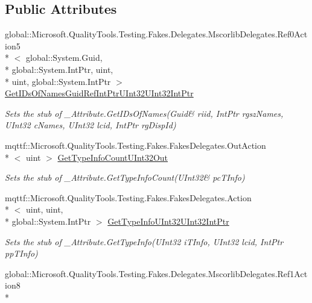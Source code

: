 \subsection*{Public Attributes}
\begin{DoxyCompactItemize}
\item 
global\-::\-Microsoft.\-Quality\-Tools.\-Testing.\-Fakes.\-Delegates.\-Mscorlib\-Delegates.\-Ref0\-Action5\\*
$<$ global\-::\-System.\-Guid, \\*
global\-::\-System.\-Int\-Ptr, uint, \\*
uint, global\-::\-System.\-Int\-Ptr $>$ \hyperlink{class_system_1_1_runtime_1_1_interop_services_1_1_fakes_1_1_stub___attribute_ac09dcb88e3cef99bbc25b5793b2cf921}{Get\-I\-Ds\-Of\-Names\-Guid\-Ref\-Int\-Ptr\-U\-Int32\-U\-Int32\-Int\-Ptr}
\begin{DoxyCompactList}\small\item\em Sets the stub of \-\_\-\-Attribute.\-Get\-I\-Ds\-Of\-Names(Guid\& riid, Int\-Ptr rgsz\-Names, U\-Int32 c\-Names, U\-Int32 lcid, Int\-Ptr rg\-Disp\-Id)\end{DoxyCompactList}\item 
mqttf\-::\-Microsoft.\-Quality\-Tools.\-Testing.\-Fakes.\-Fakes\-Delegates.\-Out\-Action\\*
$<$ uint $>$ \hyperlink{class_system_1_1_runtime_1_1_interop_services_1_1_fakes_1_1_stub___attribute_a89ae0abf374e44257d2ba7c2fb028fab}{Get\-Type\-Info\-Count\-U\-Int32\-Out}
\begin{DoxyCompactList}\small\item\em Sets the stub of \-\_\-\-Attribute.\-Get\-Type\-Info\-Count(U\-Int32\& pc\-T\-Info)\end{DoxyCompactList}\item 
mqttf\-::\-Microsoft.\-Quality\-Tools.\-Testing.\-Fakes.\-Fakes\-Delegates.\-Action\\*
$<$ uint, uint, \\*
global\-::\-System.\-Int\-Ptr $>$ \hyperlink{class_system_1_1_runtime_1_1_interop_services_1_1_fakes_1_1_stub___attribute_a9c5bca549aafbb4d72a12629efad0c88}{Get\-Type\-Info\-U\-Int32\-U\-Int32\-Int\-Ptr}
\begin{DoxyCompactList}\small\item\em Sets the stub of \-\_\-\-Attribute.\-Get\-Type\-Info(\-U\-Int32 i\-T\-Info, U\-Int32 lcid, Int\-Ptr pp\-T\-Info)\end{DoxyCompactList}\item 
global\-::\-Microsoft.\-Quality\-Tools.\-Testing.\-Fakes.\-Delegates.\-Mscorlib\-Delegates.\-Ref1\-Action8\\*

\end{DoxyCompactItemize}
